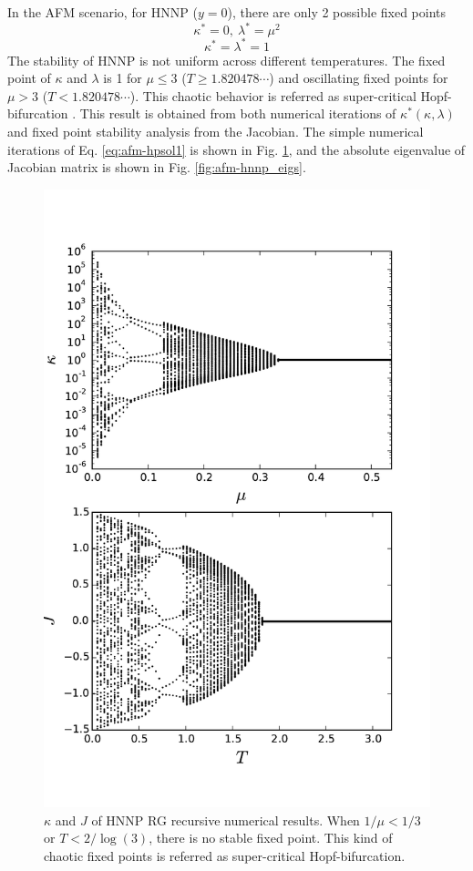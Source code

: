 In the AFM scenario, for HNNP ($y = 0$), there are only 2 possible fixed points 
\begin{equation}
\kappa^* = 0, \ \lambda^* = \mu^2 
\end{equation} 
\begin{equation}
\kappa^* = \lambda^* = 1 
\end{equation} 
 The stability of HNNP is not uniform across different temperatures. The fixed point of $\kappa$ and $\lambda$ is 1 for $\mu \le 3$ ($T\ge1.820478\cdots$) and oscillating fixed points for $\mu > 3$ ($T<1.820478\cdots$). This chaotic behavior is referred as super-critical Hopf-bifurcation  \cite{weinrib1983critical}. This result is obtained from both numerical iterations of $\kappa^*(\kappa, \lambda)$ and fixed point stability analysis from the Jacobian.
The simple numerical iterations of Eq. \ref{eq:afm-hpsol1} is shown in Fig. \ref{fig:afm-hnnpkappa}, and the absolute eigenvalue of Jacobian matrix is shown in Fig. \ref{fig:afm-hnnp_eigs}.
\begin{figure}
\centering \includegraphics[width=0.6\columnwidth]{Chapter-3/HNNP_RG_Kvsmu_JvsT.pdf}
\protect\caption{ $\kappa$ and $J$ of HNNP RG recursive numerical results. When $1/\mu < 1/3$ or $T < 2/\log(3)$, there is no stable fixed point. This kind of chaotic fixed points is referred as super-critical Hopf-bifurcation.}
\label{fig:afm-hnnpkappa} 
\end{figure}


